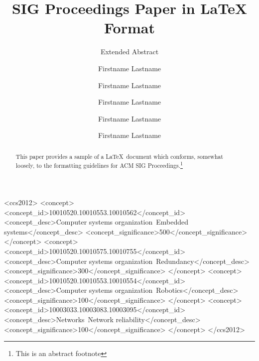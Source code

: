 \documentclass[10pt,sigconf]{acmart}
\begin{document}
\title{SIG Proceedings Paper in LaTeX Format}
\subtitle{Extended Abstract}

\author{Firstname Lastname}

\author{Firstname Lastname}

\author{Firstname Lastname}

\author{Firstname Lastname}

\author{Firstname Lastname}


\renewcommand{\shortauthors}{F. Lastname et al.}


\begin{abstract}
This paper provides a sample of a \LaTeX\ document which conforms,
somewhat loosely, to the formatting guidelines for
ACM SIG Proceedings.\footnote{This is an abstract footnote}
\end{abstract}

%
%
\begin{CCSXML}
<ccs2012>
 <concept>
  <concept_id>10010520.10010553.10010562</concept_id>
  <concept_desc>Computer systems organization~Embedded systems</concept_desc>
  <concept_significance>500</concept_significance>
 </concept>
 <concept>
  <concept_id>10010520.10010575.10010755</concept_id>
  <concept_desc>Computer systems organization~Redundancy</concept_desc>
  <concept_significance>300</concept_significance>
 </concept>
 <concept>
  <concept_id>10010520.10010553.10010554</concept_id>
  <concept_desc>Computer systems organization~Robotics</concept_desc>
  <concept_significance>100</concept_significance>
 </concept>
 <concept>
  <concept_id>10003033.10003083.10003095</concept_id>
  <concept_desc>Networks~Network reliability</concept_desc>
  <concept_significance>100</concept_significance>
 </concept>
</ccs2012>  
\end{CCSXML}
\end{document}
